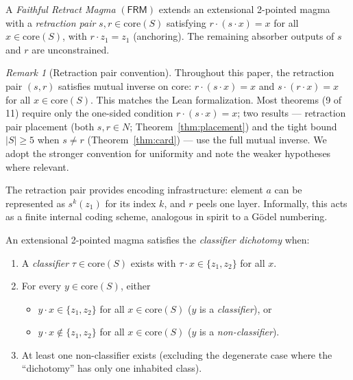 \documentclass[sigconf,screen,review,anonymous]{acmart}
\newcommand{\dotop}{\cdot}
\newcommand{\FRM}{\textsf{FRM}}
\newcommand{\core}{\mathrm{core}}
\theoremstyle{remark}
\newtheorem{remark}{Remark}
\begin{document}
\begin{definition}
\label{def:frm}
A \emph{Faithful Retract Magma} $(\FRM)$ extends an extensional 2-pointed magma with a \emph{retraction pair} $s, r \in \core(S)$ satisfying $r \dotop (s \dotop x) = x$ for all $x \in \core(S)$, with $r \dotop z_1 = z_1$ (anchoring). The remaining absorber outputs of $s$ and $r$ are unconstrained.
\end{definition}

\begin{remark}[Retraction pair convention]
\label{rem:mutual}
Throughout this paper, the retraction pair $(s, r)$ satisfies mutual inverse on core: $r \dotop (s \dotop x) = x$ and $s \dotop (r \dotop x) = x$ for all $x \in \core(S)$. This matches the Lean formalization. Most theorems (9 of 11) require only the one-sided condition $r \dotop (s \dotop x) = x$; two results --- retraction pair placement (both $s, r \in N$; Theorem~\ref{thm:placement}) and the tight bound $|S| \geq 5$ when $s \neq r$ (Theorem~\ref{thm:card}) --- use the full mutual inverse. We adopt the stronger convention for uniformity and note the weaker hypotheses where relevant.
\end{remark}

The retraction pair provides encoding infrastructure: element $a$ can be represented as $s^k(z_1)$ for its index $k$, and $r$ peels one layer. Informally, this acts as a finite internal coding scheme, analogous in spirit to a G\"odel numbering.

\begin{definition}
\label{def:cd}
An extensional 2-pointed magma satisfies the \emph{classifier dichotomy} when:
\begin{enumerate}
  \item A \emph{classifier} $\tau \in \core(S)$ exists with $\tau \dotop x \in \{z_1, z_2\}$ for all $x$.
  \item For every $y \in \core(S)$, either
    \begin{itemize}
      \item $y \dotop x \in \{z_1, z_2\}$ for all $x \in \core(S)$ \quad ($y$ is a \emph{classifier}), or
      \item $y \dotop x \notin \{z_1, z_2\}$ for all $x \in \core(S)$ \quad ($y$ is a \emph{non-classifier}).
    \end{itemize}
  \item At least one non-classifier exists (excluding the degenerate case where the ``dichotomy'' has only one inhabited class).
\end{enumerate}
\end{definition}
\end{document}
